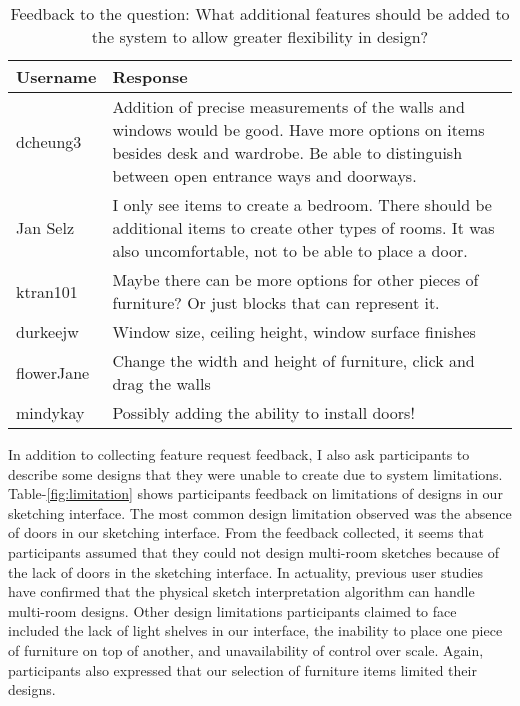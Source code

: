 \begin{table}[h]
\centering
\begin{tabular}{|p{}|p{}|}
\hline
\rowcolor[HTML]{EFEFEF} 
Username   & Response                                                                                                                                                                                       \\ \hline
dcheung3   & Addition of precise measurements of the walls and windows would be good. Have more options on items besides desk and wardrobe. Be able to distinguish between open entrance ways and doorways. \\ \hline
Jan Selz   & I only see items to create a bedroom.  There should be additional items to create other types of rooms.  It was also uncomfortable, not to be able to place a door.                            \\ \hline
ktran101   & Maybe there can be more options for other pieces of furniture? Or just blocks that can represent it.                                                                                           \\ \hline
durkeejw   & Window size, ceiling height, window surface finishes                                                                                                                                           \\ \hline
flowerJane & Change the width and height of furniture, click and drag the walls                                                                                                                             \\ \hline
mindykay   & Possibly adding the ability to install doors!                                                                                                                                                  \\ \hline
\end{tabular}
\caption{Feedback to the question: What additional features should be added to the system to allow greater flexibility in design?}
\label{fig:features}
\end{table}


In addition to collecting feature request feedback, I also ask participants to describe some designs that they were unable to create due to system limitations.
Table-\ref{fig:limitation} shows participants feedback on limitations of designs in our sketching interface.
The most common design limitation observed was the absence of doors in our sketching interface.
From the feedback collected, it seems that participants assumed that they could not design multi-room sketches because of the lack of doors in the sketching interface.
In actuality, previous user studies have confirmed that the physical sketch interpretation algorithm can handle multi-room designs.
Other design limitations participants claimed to face included the lack of light shelves in our interface, the inability to place one piece of furniture on top of another, and unavailability of control over scale.
Again, participants also expressed that our selection of furniture items limited their designs. \\

